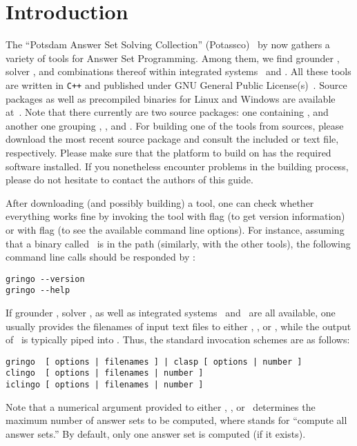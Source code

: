 \section{Introduction}\label{sec:introduction}

The ``Potsdam Answer Set Solving Collection'' (Potassco)~\cite{potassco}
by now gathers a variety of tools for Answer Set Programming.
Among them, we find grounder \gringo, solver \clasp, and
combinations thereof within integrated systems \clingo\ and \iclingo.
All these tools are written in \texttt{C++} and published under GNU General Public License(s)~\cite{GNUgpl}.
Source packages as well as precompiled binaries for Linux and Windows are available at~\cite{potassco}.
Note that there currently are two source packages:
one containing \clasp, and another one grouping \gringo, \clingo, and \iclingo.
For building one of the tools from sources,
please download the most recent source package and consult the
included  or  text file, respectively.
Please make sure that the platform to build on has the
required software installed.
If you nonetheless encounter problems in the building process,
please do not hesitate to contact the authors of this guide.

After downloading (and possibly building) a tool,
one can check whether everything works fine by invoking the tool
with flag  (to get version information) or
with flag  (to see the available command line options).
For instance, assuming that a binary called \gringo\ is in the path
(similarly, with the other tools),
the following command line calls should be responded by \gringo:
%
\begin{lstlisting}[numbers=none]
gringo --version
gringo --help
\end{lstlisting}
If grounder \gringo, solver \clasp, as well as integrated systems
\clingo\ and \iclingo\ are all available,
one usually provides the filenames of input text files to either
\gringo, \clingo, or \iclingo, while the output of \gringo\ is
typically piped into \clasp.
Thus, the standard invocation schemes are as follows:
\begin{lstlisting}[numbers=none]
gringo  [ options | filenames ] | clasp [ options | number ]
clingo  [ options | filenames | number ]
iclingo [ options | filenames | number ]
\end{lstlisting}
Note that a numerical argument provided to either \clasp, \clingo, or \iclingo\
determines the maximum number of answer sets to be computed,
where  stands for ``compute all answer sets.''
By default, only one answer set is computed (if it exists).


